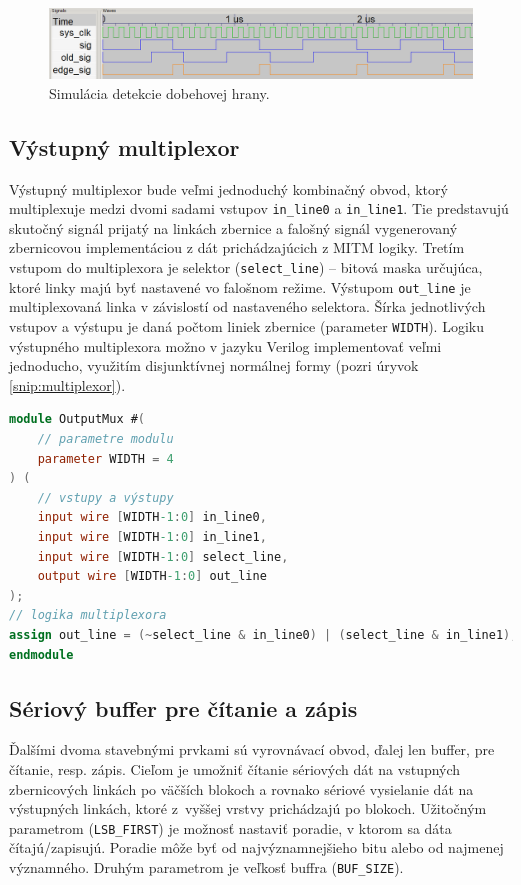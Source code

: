 \begin{figure}
    \centerline{\includegraphics[width=1\textwidth]{images/simulations/edgeDetectSim.png}}
    \caption[Simulácia detekcie dobehovej hrany]{Simulácia detekcie dobehovej hrany.}
    \label{obr:edgeDetectSim}
\end{figure}

\subsection{Výstupný multiplexor}\label{subsek:multiplexor}
Výstupný multiplexor bude veľmi jednoduchý kombinačný obvod, ktorý multiplexuje medzi dvomi sadami vstupov \texttt{in\_line0} a \texttt{in\_line1}. Tie predstavujú skutočný signál prijatý na linkách zbernice a falošný signál vygenerovaný zbernicovou implementáciou z dát prichádzajúcich z MITM logiky. Tretím vstupom do multiplexora je selektor (\texttt{select\_line}) -- bitová maska určujúca, ktoré linky majú byť nastavené vo falošnom režime. Výstupom \texttt{out\_line} je multiplexovaná linka v závislostí od nastaveného selektora. Šírka jednotlivých vstupov a výstupu je daná počtom liniek zbernice (parameter \texttt{WIDTH}). Logiku výstupného multiplexora možno v jazyku Verilog implementovať veľmi jednoducho, využitím disjunktívnej normálnej formy (pozri úryvok \ref{snip:multiplexor}).

\begin{lstlisting}[float,language=Verilog,caption={Logika výstupného multiplexora v jazyku Verilog. Sémantika operátorov \texttt{\&} a \texttt{|} pre viacbitové signály zabezpečí paralelné spracovanie všetkých liniek.},label=snip:multiplexor]
module OutputMux #(
	// parametre modulu
	parameter WIDTH = 4
) (
    // vstupy a výstupy
    input wire [WIDTH-1:0] in_line0,
    input wire [WIDTH-1:0] in_line1,
    input wire [WIDTH-1:0] select_line,
    output wire [WIDTH-1:0] out_line
);
// logika multiplexora
assign out_line = (~select_line & in_line0) | (select_line & in_line1);
endmodule
\end{lstlisting}

\subsection{Sériový buffer pre čítanie a zápis}
Ďalšími dvoma stavebnými prvkami sú vyrovnávací obvod, ďalej len buffer, pre čítanie, resp. zápis. Cieľom je umožniť čítanie sériových dát na vstupných zbernicových linkách po väčších blokoch a rovnako sériové vysielanie dát na výstupných linkách, ktoré z~vyššej vrstvy prichádzajú po blokoch. Užitočným parametrom (\texttt{LSB\_FIRST}) je možnosť nastaviť poradie, v ktorom sa dáta čítajú/zapisujú. Poradie môže byť od najvýznamnejšieho bitu alebo od najmenej významného. Druhým parametrom je veľkosť buffra (\texttt{BUF\_SIZE}).

